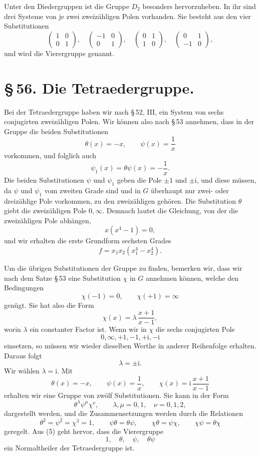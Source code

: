 \documentclass[11pt]{article}
\providecommand{\ii}{\mathrm{i}}
\providecommand{\mat}[4]{\begin{pmatrix}#1&#2\\#3&#4\end{pmatrix}}
\providecommand{\mat}[4]{\begin{pmatrix}#1&#2\\#3&#4\end{pmatrix}}
\providecommand{\mat}[1]{\begin{pmatrix}#1\end{pmatrix}}
\begin{document}
Unter den Diedergruppen ist die Gruppe $D_2$ besonders hervorzuheben. In ihr sind drei Systeme von je zwei zweizähligen Polen vorhanden. Sie besteht aus den vier Substitutionen
\begin{equation}
 \mat{1}{0}{0}{1},\quad
 \mat{-1}{0}{0}{1},\quad
 \mat{0}{1}{1}{0},\quad
 \mat{0}{1}{-1}{0},
\tag{7}
\end{equation}
und wird die Vierergruppe genannt.

\section*{\S\,56. Die Tetraedergruppe.}

Bei der Tetraedergruppe haben wir nach \S\,52, III, ein System von sechs conjugirten zweizähligen Polen. Wir können also nach \S\,53 annehmen, dass in der Gruppe die beiden Substitutionen
\begin{equation}
 \theta(x)=-x,\qquad \psi(x)=\frac1x
\tag{1}
\end{equation}
vorkommen, und folglich auch
\[
 \psi_1(x)=\theta\psi(x)=-\frac1x .
\]
Die beiden Substitutionen $\psi$ und $\psi_1$ geben die Pole $\pm1$ und $\pm\ii$, und diese müssen, da $\psi$ und $\psi_1$ vom zweiten Grade sind und in $G$ überhaupt nur zwei- oder dreizählige Pole vorkommen, zu den zweizähligen gehören. Die Substitution $\theta$ giebt die zweizähligen Pole $0,\infty$. Demnach lautet die Gleichung, von der die zweizähligen Pole abhängen,
\[
 x(x^4-1)=0,
\]
und wir erhalten die erste Grundform sechsten Grades
\begin{equation}
 f=x_1x_2(x_1^4-x_2^4).
\tag{2}
\end{equation}

Um die übrigen Substitutionen der Gruppe zu finden, bemerken wir, dass wir nach dem Satze \S\,53 eine Substitution $\chi$ in $G$ annehmen können, welche den Bedingungen
\[
 \chi(-1)=0,\qquad \chi(+1)=\infty
\]
genügt. Sie hat also die Form
\begin{equation}
 \chi(x)=\lambda\,\frac{x+1}{x-1},
\tag{3}
\end{equation}
worin $\lambda$ ein constanter Factor ist. Wenn wir in $\chi$ die sechs conjugirten Pole
\[
0,\infty,+1,-1,+\ii,-\ii
\]
einsetzen, so müssen wir wieder dieselben Werthe in anderer Reihenfolge erhalten. Daraus folgt
\[
 \lambda=\pm\ii .
\]
Wir wählen $\lambda=\ii$. Mit
\[
 \theta(x)=-x,\qquad \psi(x)=\frac1x,\qquad
 \chi(x)=\ii\,\frac{x+1}{x-1}
\]
erhalten wir eine Gruppe von zwölf Substitutionen. Sie kann in der Form
\begin{equation}
 \theta^\lambda\psi^\mu\chi^\nu,\qquad
 \lambda,\mu=0,1,\quad \nu=0,1,2,
\tag{4}
\end{equation}
dargestellt werden, und die Zusammensetzungen werden durch die Relationen
\begin{equation}
 \theta^2=\psi^2=\chi^3=1,\qquad
 \psi\theta=\theta\psi,\qquad
 \chi\theta=\psi\chi,\qquad
 \chi\psi=\theta\chi
\tag{5}
\end{equation}
geregelt. Aus (5) geht hervor, dass die Vierergruppe
\begin{equation}
 1,\quad \theta,\quad \psi,\quad \theta\psi
\tag{6}
\end{equation}
ein Normaltheiler der Tetraedergruppe ist.
\end{document}
